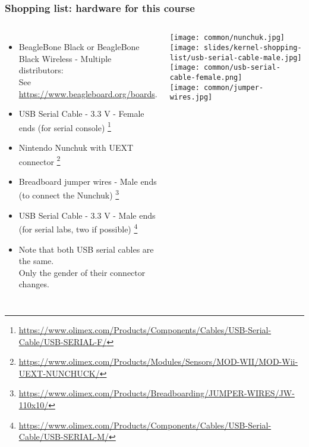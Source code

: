 \begin{frame}
\frametitle{Shopping list: hardware for this course}
  \begin{columns}
    \footnotesize
    \begin{itemize}
      \item BeagleBone Black or BeagleBone Black Wireless - Multiple distributors: \\
            See \url{https://www.beagleboard.org/boards}.
      \item USB Serial Cable - 3.3 V - Female ends (for serial console)
            \footnote{\tiny \url{https://www.olimex.com/Products/Components/Cables/USB-Serial-Cable/USB-SERIAL-F/}}
      \item Nintendo Nunchuk with UEXT connector
            \footnote{\tiny \url{https://www.olimex.com/Products/Modules/Sensors/MOD-WII/MOD-Wii-UEXT-NUNCHUCK/}}
      \item Breadboard jumper wires - Male ends (to connect the Nunchuk)
            \footnote{\tiny \url{https://www.olimex.com/Products/Breadboarding/JUMPER-WIRES/JW-110x10/}}
      \item USB Serial Cable - 3.3 V - Male ends (for serial labs, two if possible)
            \footnote{\tiny \url{https://www.olimex.com/Products/Components/Cables/USB-Serial-Cable/USB-SERIAL-M/}}
      \item Note that both USB serial cables are the same.\\
            Only the gender of their connector changes.
    \end{itemize}
    \texttt{[image: common/nunchuk.jpg]} \\
    \texttt{[image: slides/kernel-shopping-list/usb-serial-cable-male.jpg]} \\
    \texttt{[image: common/usb-serial-cable-female.png]} \\
    \texttt{[image: common/jumper-wires.jpg]}
  \end{columns}
\end{frame}
